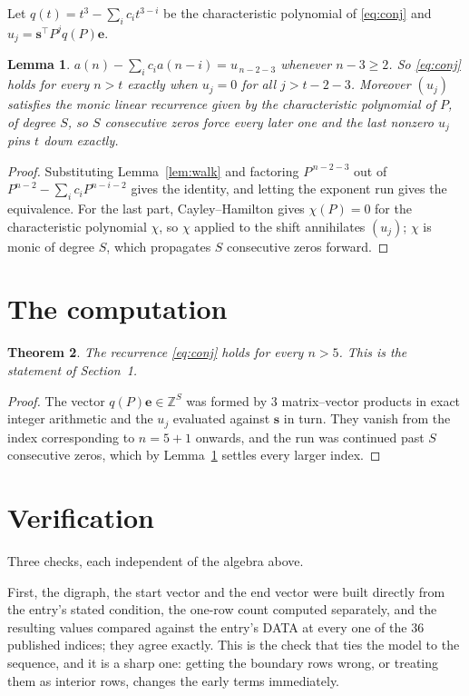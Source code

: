 \documentclass[11pt,a4paper]{article}
\theoremstyle{plain}
\newtheorem{theorem}{Theorem}
\newtheorem{lemma}[theorem]{Lemma}
\theoremstyle{definition}
\begin{document}
Let $q(t)=t^{3}-\sum_i c_i t^{3-i}$ be the characteristic polynomial of
\eqref{eq:conj} and $u_j=\mathbf{s}^{\!\top}P^{j}q(P)\mathbf{e}$.

\begin{lemma}\label{lem:crit}
$a(n)-\sum_i c_i a(n-i)=u_{\,n-2-3}$ whenever $n-3\ge2$. So \eqref{eq:conj}
holds for every $n>t$ exactly when $u_j=0$ for all $j>t-2-3$. Moreover $(u_j)$
satisfies the monic linear recurrence given by the characteristic polynomial of $P$, of
degree $S$, so $S$ consecutive zeros force every later one and the last nonzero $u_j$ pins
$t$ down exactly.
\end{lemma}

\begin{proof}
Substituting Lemma~\ref{lem:walk} and factoring $P^{\,n-2-3}$ out of
$P^{n-2}-\sum_i c_i P^{n-i-2}$ gives the identity, and letting the exponent run gives the
equivalence. For the last part, Cayley--Hamilton gives $\chi(P)=0$ for the characteristic
polynomial $\chi$, so $\chi$ applied to the shift annihilates $(u_j)$; $\chi$ is monic of
degree $S$, which propagates $S$ consecutive zeros forward.
\end{proof}

\section{The computation}

\begin{theorem}
The recurrence \eqref{eq:conj} holds for every $n>5$. This is the statement of
Section~1.
\end{theorem}

\begin{proof}
The vector $q(P)\mathbf{e}\in\mathbb{Z}^{S}$ was formed by $3$ matrix--vector
products in exact integer arithmetic and the $u_j$ evaluated against $\mathbf{s}$ in turn.
They vanish from the index corresponding to $n=5+1$ onwards, and the run was continued
past $S$ consecutive zeros, which by Lemma~\ref{lem:crit} settles every larger index.
\end{proof}

\section{Verification}

Three checks, each independent of the algebra above.

First, the digraph, the start vector and the end vector were built directly from the
entry's stated condition, the one-row count computed separately, and the resulting values
compared against the entry's DATA at every one of the $36$ published indices; they
agree exactly. This is the check that ties the model to the sequence, and it is a sharp one:
getting the boundary rows wrong, or treating them as interior rows, changes the early terms
immediately.
\end{document}
